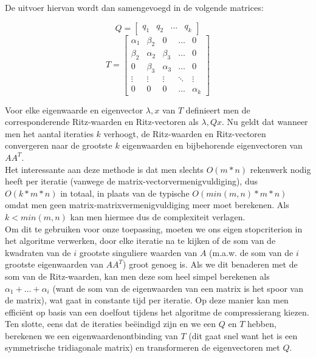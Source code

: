 De uitvoer hiervan wordt dan samengevoegd in de volgende matrices:

\[
Q = 
\begin{bmatrix}
    q_1 & q_2 & \dots & q_k
\end{bmatrix}
\]
\[
T = \begin{bmatrix}
\alpha_1 & \beta_2 & 0 & \dots & 0 \\
\beta_2 & \alpha_2 & \beta_3 & \dots & 0 \\
0 & \beta_3 & \alpha_3 & \dots & 0 \\
\vdots & \vdots & \vdots & \ddots & \vdots \\
0 & 0 & 0 & \dots & \alpha_k
\end{bmatrix}
\]

Voor elke eigenwaarde en eigenvector $\lambda, x$ van $T$ definieert men de corresponderende Ritz-waarden en Ritz-vectoren als $\lambda, Qx$. Nu geldt dat wanneer men het aantal iteraties $k$ verhoogt, de Ritz-waarden en Ritz-vectoren convergeren naar de grootste $k$ eigenwaarden en bijbehorende eigenvectoren van $A A^T$.\\

Het interessante aan deze methode is dat men slechts $O(m*n)$ rekenwerk nodig heeft per iteratie (vanwege de matrix-vectorvermenigvuldiging), dus $O(k*m*n)$ in totaal, in plaats van de typische $O(min(m, n)*m*n)$ omdat men geen matrix-matrixvermenigvuldiging meer moet berekenen. Als $k < min(m, n)$ kan men hiermee dus de complexiteit verlagen.\\

Om dit te gebruiken voor onze toepassing, moeten we ons eigen stopcriterion in het algoritme verwerken, door elke iteratie na te kijken of de som van de kwadraten van de $i$ grootste singuliere waarden van $A$ (m.a.w. de som van de $i$ grootste eigenwaarden van $A A^T$) groot genoeg is. Als we dit benaderen met de som van de Ritz-waarden, kan men deze som heel simpel berekenen als $\alpha_1 + \dots + \alpha_i$ (want de som van de eigenwaarden van een matrix is het spoor van de matrix), wat gaat in constante tijd per iteratie. Op deze manier kan men effici\"ent op basis van een doelfout tijdens het algoritme de compressierang kiezen.\\

Ten slotte, eens dat de iteraties be\"eindigd zijn en we een $Q$ en $T$ hebben, berekenen we een eigenwaardenontbinding van $T$ (dit gaat snel want het is een symmetrische tridiagonale matrix) en transformeren de eigenvectoren met $Q$.

